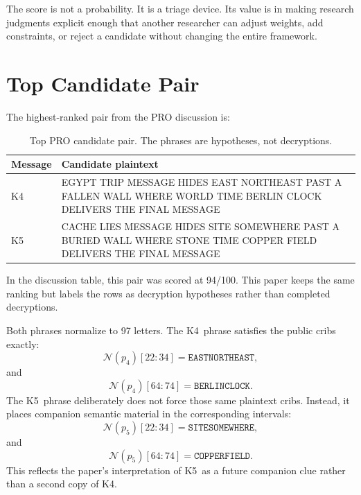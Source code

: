 \documentclass[12pt]{paperFormatting}
\newcommand{\Kfour}{K4}
\newcommand{\Kfive}{K5}
\newcommand{\Norm}{\mathcal{N}}
\begin{document}
\begin{thesisbody}
The score is not a probability. It is a triage device. Its value is in making research judgments explicit enough that another researcher can adjust weights, add constraints, or reject a candidate without changing the entire framework.

\section{Top Candidate Pair}
The highest-ranked pair from the PRO discussion is:
\begin{table}[H]
\caption{Top PRO candidate pair. The phrases are hypotheses, not decryptions.}
\centering
\small
\begin{tabular}{L{0.12\textwidth}L{0.74\textwidth}}
\toprule
Message & Candidate plaintext \\
\midrule
\Kfour &
EGYPT TRIP MESSAGE HIDES EAST NORTHEAST PAST A FALLEN WALL WHERE WORLD TIME BERLIN CLOCK DELIVERS THE FINAL MESSAGE \\
\Kfive &
CACHE LIES MESSAGE HIDES SITE SOMEWHERE PAST A BURIED WALL WHERE STONE TIME COPPER FIELD DELIVERS THE FINAL MESSAGE \\
\bottomrule
\end{tabular}
\end{table}

In the discussion table, this pair was scored at 94/100. This paper keeps the same ranking but labels the rows as decryption hypotheses rather than completed decryptions.

Both phrases normalize to 97 letters. The \Kfour\ phrase satisfies the public cribs exactly:
\begin{equation}
    \Norm(p_4)[22:34] = \texttt{EASTNORTHEAST},
\end{equation}
and
\begin{equation}
    \Norm(p_4)[64:74] = \texttt{BERLINCLOCK}.
\end{equation}
The \Kfive\ phrase deliberately does not force those same plaintext cribs. Instead, it places companion semantic material in the corresponding intervals:
\begin{equation}
    \Norm(p_5)[22:34] = \texttt{SITESOMEWHERE},
\end{equation}
and
\begin{equation}
    \Norm(p_5)[64:74] = \texttt{COPPERFIELD}.
\end{equation}
This reflects the paper's interpretation of \Kfive\ as a future companion clue rather than a second copy of \Kfour.


\end{thesisbody}
\end{document}
